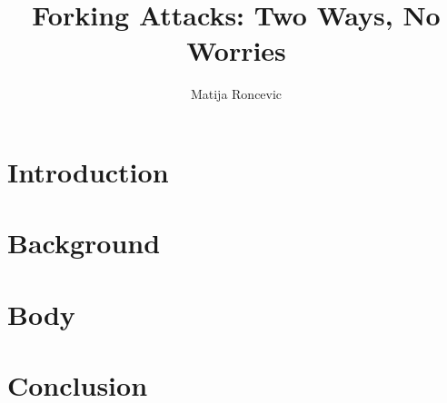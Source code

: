 \documentclass[sigconf]{acmart}
\title{Forking Attacks: Two Ways, No Worries}
\author{Matija Roncevic}
\affiliation{
    \institution{Friedricht-Alexander-Universität Erlangen-Nürnberg}
    \country{}
    \city{}}
\begin{document}
\maketitle  %

\thispagestyle{plain} %
\pagestyle{plain} %



\section{Introduction}


\section{Background}


\section{Body}


\section{Conclusion}



\end{document}
